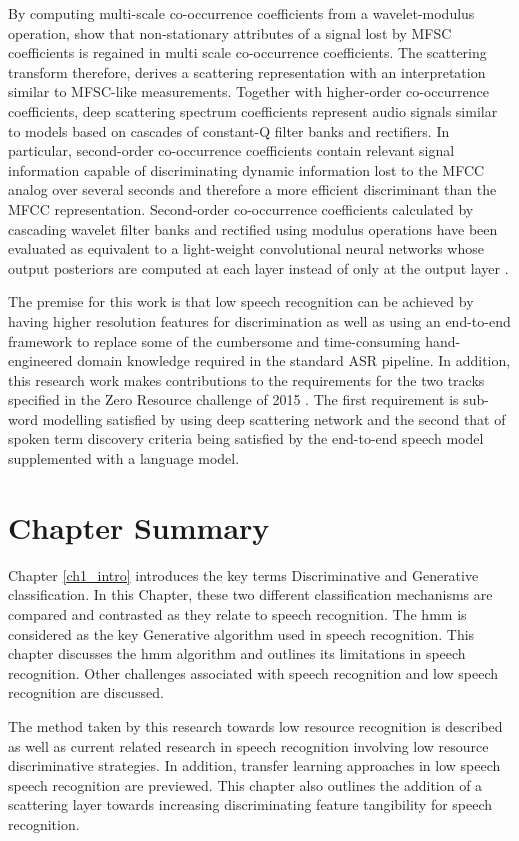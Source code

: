 By computing multi-scale co-occurrence coefficients from a wavelet-modulus operation, \cite{anden2011multiscale} show that non-stationary attributes of a signal lost by MFSC coefficients is regained in multi scale co-occurrence coefficients. The scattering transform therefore, derives a scattering representation with an interpretation similar to MFSC-like measurements.  Together with higher-order co-occurrence coefficients, deep scattering spectrum coefficients represent audio signals similar to  models based on cascades of constant-Q filter banks and rectifiers.  In particular, second-order co-occurrence coefficients contain relevant signal information capable of discriminating dynamic information lost to the MFCC analog over several seconds and therefore a more efficient discriminant than the MFCC representation. Second-order co-occurrence coefficients calculated by cascading wavelet filter banks and rectified using modulus operations have been evaluated as equivalent to a light-weight convolutional neural networks whose output posteriors are computed at each layer instead of only at the output layer \citep{mallat2016understanding}.

The premise for this work is that low speech recognition can be achieved by having higher resolution features for discrimination as well as using an end-to-end framework to replace some of the cumbersome and time-consuming hand-engineered domain knowledge required in the standard ASR pipeline.  In addition, this research work makes contributions to the requirements for the two tracks specified in the Zero Resource challenge of 2015 \citep{versteegh2015zero}.  The first requirement is sub-word modelling satisfied by using deep scattering network and the second that of spoken term discovery criteria being satisfied by the end-to-end speech model supplemented with a language model.


\section{Chapter Summary}
Chapter \ref{ch1_intro} introduces the key terms Discriminative and Generative classification.  In this Chapter, these two different classification mechanisms are compared and contrasted as they relate to speech recognition.  The \acrfull{hmm} is considered as the key Generative algorithm used in speech recognition.  This chapter discusses the \acrshort{hmm} algorithm and outlines its limitations in speech recognition.  Other challenges associated with speech recognition and low speech recognition are discussed.  

The method taken by this research towards low resource recognition is described as well as current related research in speech recognition involving low resource discriminative strategies.  In addition, transfer learning approaches in low speech speech recognition are previewed. This chapter also outlines the addition of a scattering layer towards increasing discriminating feature tangibility for speech recognition.
